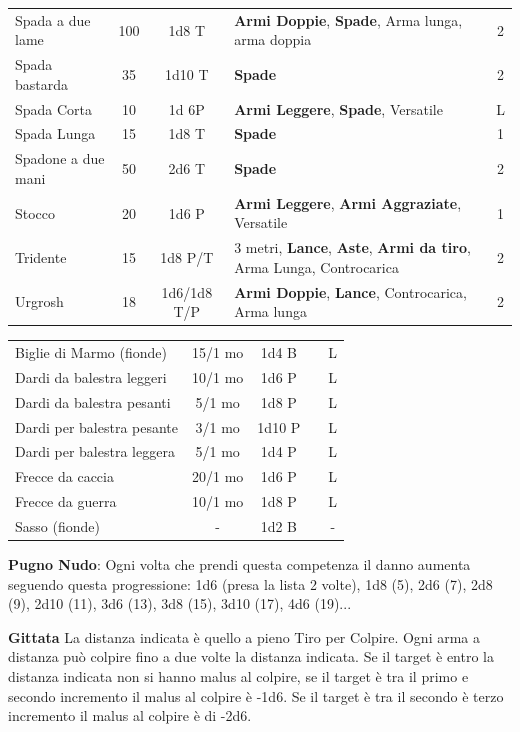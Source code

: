 \documentclass[a4paper,11pt,twoside,openany]{book}
\begin{document}
\begin{tabularx}{0.95\textwidth}{lccXc}
	Spada a due lame& 100& 1d8 T& \textbf{Armi Doppie}, \textbf{Spade}, Arma lunga, arma doppia& 2\\
	Spada bastarda& 35 & 1d10 T&\textbf{Spade}& 2\\
	Spada Corta& 10 & 1d 6P&\textbf{Armi Leggere}, \textbf{Spade}, Versatile& L\\
	Spada Lunga& 15 & 1d8 T&\textbf{Spade}& 1\\
	Spadone a due mani& 50 & 2d6 T&\textbf{Spade}& 2\\
	Stocco& 20 & 1d6 P& \textbf{Armi Leggere}, \textbf{Armi Aggraziate}, Versatile& 1\\
	Tridente& 15 & 1d8 P/T& 3 metri, \textbf{Lance}, \textbf{Aste}, \textbf{Armi da tiro}, Arma Lunga, Controcarica& 2\\
	Urgrosh& 18 & 1d6/1d8 T/P& \textbf{Armi Doppie}, \textbf{Lance}, Controcarica, Arma lunga & 2\\
\end{tabularx}

\bigskip

\begin{tabularx}{0.95\textwidth}{lccXc}	
	Biglie di Marmo (fionde)& 15/1 mo & 1d4 B & & L\\
	Dardi da balestra leggeri & 10/1 mo & 1d6 P & & L\\
	Dardi da balestra pesanti & 5/1 mo & 1d8 P & & L\\
	Dardi per balestra pesante & 3/1 mo & 1d10 P & & L\\
	Dardi per balestra leggera & 5/1 mo & 1d4 P & & L\\
	Frecce da caccia& 20/1 mo & 1d6 P& &L\\
	Frecce da guerra& 10/1 mo & 1d8 P& &L\\
	Sasso (fionde)& -& 1d2 B& &-\\
\end{tabularx}

\textbf{Pugno Nudo}: Ogni volta che prendi questa competenza il danno aumenta seguendo questa progressione: 1d6 (presa la lista 2 volte), 1d8 (5), 2d6 (7), 2d8 (9), 2d10 (11), 3d6 (13), 3d8 (15), 3d10 (17), 4d6 (19)...

\bigskip

\textbf{Gittata}
La distanza indicata è quello a pieno Tiro per Colpire. Ogni arma a distanza può colpire  fino a due volte la distanza indicata. Se il target è entro la distanza indicata non si hanno malus al colpire, se il target è tra il primo e secondo incremento il malus al colpire è -1d6. Se il target è tra il secondo è terzo incremento il malus al colpire è di -2d6.
\end{document}
